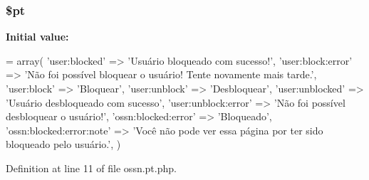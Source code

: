 \subsubsection[{\texorpdfstring{\$pt}{$pt}}]{\setlength{\rightskip}{0pt plus 5cm}\$pt}\hypertarget{components_2_ossn_block_2locale_2ossn_8pt_8php_a62c150775a7a00e8663463c638016cad}{}\label{components_2_ossn_block_2locale_2ossn_8pt_8php_a62c150775a7a00e8663463c638016cad}
{\bfseries Initial value\+:}
\begin{DoxyCode}
= array(
    \textcolor{stringliteral}{'user:blocked'} => \textcolor{stringliteral}{'Usuário bloqueado com sucesso!'},
    \textcolor{stringliteral}{'user:block:error'} => \textcolor{stringliteral}{'Não foi possível bloquear o usuário! Tente novamente mais tarde.'},
    \textcolor{stringliteral}{'user:block'} => \textcolor{stringliteral}{'Bloquear'},
    \textcolor{stringliteral}{'user:unblock'} => \textcolor{stringliteral}{'Desbloquear'},
    \textcolor{stringliteral}{'user:unblocked'} => \textcolor{stringliteral}{'Usuário desbloqueado com sucesso'},
    \textcolor{stringliteral}{'user:unblock:error'} => \textcolor{stringliteral}{'Não foi possível desbloquear o usuário!'},
    \textcolor{stringliteral}{'ossn:blocked:error'} => \textcolor{stringliteral}{'Bloqueado'},
    \textcolor{stringliteral}{'ossn:blocked:error:note'} => \textcolor{stringliteral}{'Você não pode ver essa página por ter sido bloqueado pelo usuário.'},
)
\end{DoxyCode}


Definition at line 11 of file ossn.\+pt.\+php.


